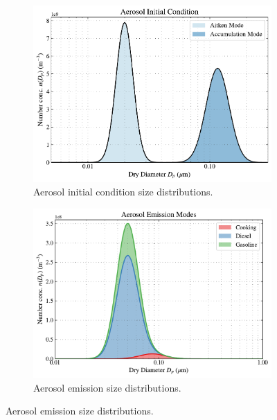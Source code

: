 \begin{figure}[h]
  \centering
  \begin{subfigure}
    \centering
    \includegraphics[width=.85\textwidth]{figures/urban-plume-aerosol-ic.pdf}
    \caption{Aerosol initial condition size distributions.}
    \label{fig:aero_ic_dist}
  \end{subfigure}
   \vspace*{5mm} 
  \begin{subfigure}
    \centering
    \includegraphics[width=.85\textwidth]{figures/urban-plume-aerosol-emissions.pdf}
    \caption{Aerosol emission size distributions.}
    \label{fig:aero_emiss_dist}
  \end{subfigure}
\end{figure}



